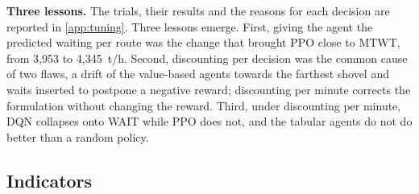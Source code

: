 \documentclass[11pt,a4paper]{article}
\newif\ifcorrmarks
\newenvironment{corrbloc}{\par\ifcorrmarks\color{corrcolor}\fi}{\par}
\begin{document}
\begin{corrbloc}
\textbf{Three lessons.} The trials, their results and the reasons for each decision are reported in \cref{app:tuning}. Three lessons emerge. First, giving the agent the predicted waiting per route was the change that brought PPO close to MTWT, from 3{,}953 to 4{,}345~t/h. Second, discounting per decision was the common cause of two flaws, a drift of the value-based agents towards the farthest shovel and waits inserted to postpone a negative reward; discounting per minute corrects the formulation without changing the reward. Third, under discounting per minute, DQN collapses onto WAIT while PPO does not, and the tabular agents do not do better than a random policy.
\end{corrbloc}



\subsection{Indicators}
\label{sec:metrics}
\end{document}
